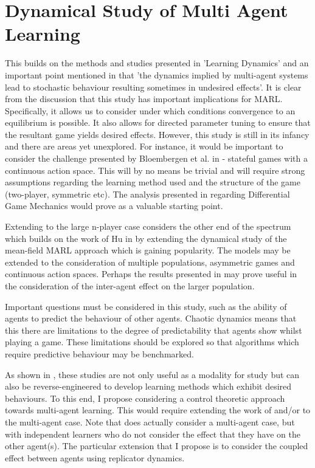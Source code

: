 \documentclass[../sample.tex]{subfiles}
\begin{document}
\section{Dynamical Study of Multi Agent Learning}


This builds on the methods and studies presented in 'Learning Dynamics' and an important point
mentioned in \cite{Marinescu2014} that 'the dynamics implied by multi-agent systems lead to
stochastic behaviour resulting sometimes in undesired effects'. It is clear from the discussion that
this study has important implications for MARL. Specifically, it allows us to consider under which
conditions convergence to an equilibrium is possible. It also allows for directed parameter tuning
to ensure that the resultant game yields desired effects. However, this study is still in its
infancy and there are areas yet unexplored. For instance, it would be important to consider the
challenge presented by Bloembergen et al. in \cite{Bloembergen2015} - stateful games with a
continuous action space. This will by no means be trivial and will require strong assumptions
regarding the learning method used and the structure of the game (two-player, symmetric etc). The
analysis presented in \cite{Letcher2019DifferentiableMechanics} regarding Differential Game
Mechanics would prove as a valuable starting point. 

Extending to the large n-player case considers the other end of the spectrum which builds on the
work of Hu in \cite{Hu2019} by extending the dynamical study of the mean-field MARL approach which
is gaining popularity. The models may be extended to the consideration of multiple populations,
asymmetric games and continuous action spaces. Perhaps the results presented in \cite{Bellomo2017}
may prove useful in the consideration of the inter-agent effect on the larger population. 

Important questions must be considered in this study, such as the ability of agents to predict the
behaviour of other agents. Chaotic dynamics means that this there are limitations to the degree of
predictability that agents show whilst playing a game. These limitations should be explored so that
algorithms which require predictive behaviour may be benchmarked. 

As shown in \cite{Bloembergen2015}, these studies are not only useful as a modality for study but
can also be reverse-engineered to develop learning methods which exhibit desired behaviours. To this
end, I propose considering a control theoretic approach towards multi-agent learning. This would
require extending the work of \cite{Berkenkamp2017} and/or
\cite{Jin2018Stability-certifiedPerspective} to the multi-agent case. Note that
\cite{Jin2018Stability-certifiedPerspective} does actually consider a multi-agent case, but with
independent learners who do not consider the effect that they have on the other agent(s). The
particular extension that I propose is to consider the coupled effect between agents using
replicator dynamics. 
\end{document}
